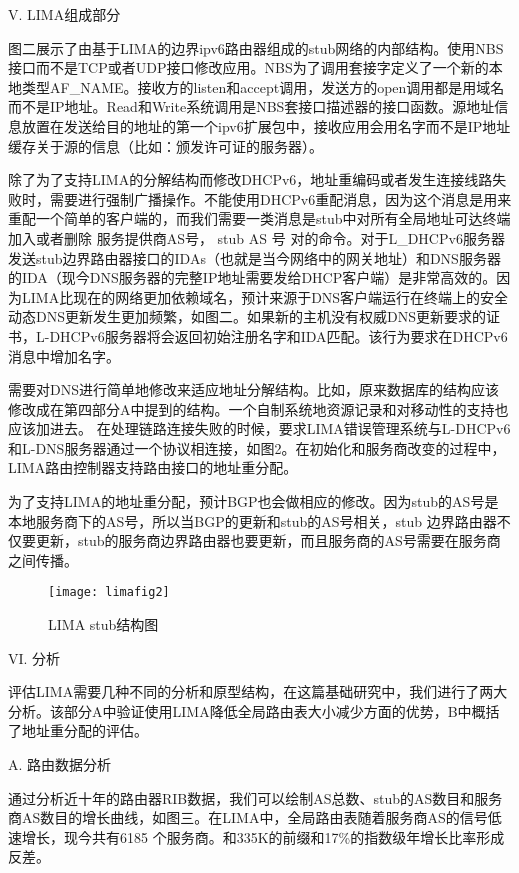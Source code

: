 \begin{center}
V.	LIMA组成部分
\end{center}
\par 图二展示了由基于LIMA的边界ipv6路由器组成的stub网络的内部结构。使用NBS接口而不是TCP或者UDP接口修改应用。NBS为了调用套接字定义了一个新的本地类型AF\_NAME。接收方的listen和accept调用，发送方的open调用都是用域名而不是IP地址。Read和Write系统调用是NBS套接口描述器的接口函数。源地址信息放置在发送给目的地址的第一个ipv6扩展包中，接收应用会用名字而不是IP地址缓存关于源的信息（比如：颁发许可证的服务器）。
\par 除了为了支持LIMA的分解结构而修改DHCPv6，地址重编码或者发生连接线路失败时，需要进行强制广播操作。不能使用DHCPv6重配消息，因为这个消息是用来重配一个简单的客户端的，而我们需要一类消息是stub中对所有全局地址可达终端加入或者删除{ 服务提供商AS号， stub AS 号 }对的命令。对于L\_DHCPv6服务器发送stub边界路由器接口的IDAs（也就是当今网络中的网关地址）和DNS服务器的IDA（现今DNS服务器的完整IP地址需要发给DHCP客户端）是非常高效的。因为LIMA比现在的网络更加依赖域名，预计来源于DNS客户端运行在终端上的安全动态DNS更新发生更加频繁，如图二。如果新的主机没有权威DNS更新要求的证书，L-DHCPv6服务器将会返回初始注册名字和IDA匹配。该行为要求在DHCPv6消息中增加名字。
\par 需要对DNS进行简单地修改来适应地址分解结构。比如，原来数据库的结构应该修改成在第四部分A中提到的结构。一个自制系统地资源记录和对移动性的支持也应该加进去。
在处理链路连接失败的时候，要求LIMA错误管理系统与L-DHCPv6和L-DNS服务器通过一个协议相连接，如图2。在初始化和服务商改变的过程中，LIMA路由控制器支持路由接口的地址重分配。
\par 为了支持LIMA的地址重分配，预计BGP也会做相应的修改。因为stub的AS号是本地服务商下的AS号，所以当BGP的更新和stub的AS号相关，stub 边界路由器不仅要更新，stub的服务商边界路由器也要更新，而且服务商的AS号需要在服务商之间传播。

\begin{figure}
  \centering
  \texttt{[image: limafig2]}\\
  \caption{LIMA stub结构图}\label{fig:limafig2}
\end{figure}

\begin{center}
VI.	分析
\end{center}
\par 评估LIMA需要几种不同的分析和原型结构，在这篇基础研究中，我们进行了两大分析。该部分A中验证使用LIMA降低全局路由表大小减少方面的优势，B中概括了地址重分配的评估。
\begin{flushleft}
A.	路由数据分析
\end{flushleft}
\par 通过分析近十年的路由器RIB数据，我们可以绘制AS总数、stub的AS数目和服务商AS数目的增长曲线，如图三。在LIMA中，全局路由表随着服务商AS的信号低速增长，现今共有6185 个服务商。和335K的前缀和17\%的指数级年增长比率形成反差。

